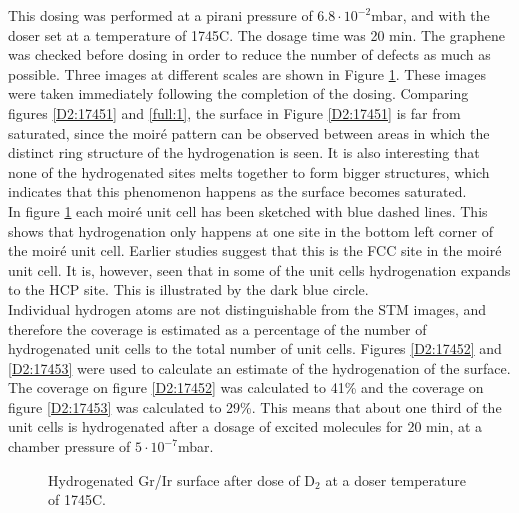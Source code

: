 This dosing was performed at a pirani pressure of $6.8 \cdot 10^{-2}$mbar, and with the doser set at a temperature of 1745\degree C. The dosage time was 20 min. The graphene was checked before dosing in order to reduce the number of defects as much as possible. Three images at different scales are shown in Figure \ref{D2:1745}. These images were taken immediately following the completion of the dosing. Comparing figures \ref{D2:17451} and \ref{full:1}, the surface in Figure \ref{D2:17451} is far from saturated, since the moiré pattern can be observed between areas in which the distinct ring structure of the hydrogenation is seen. It is also interesting that none of the hydrogenated sites melts together to form bigger structures, which indicates that this phenomenon happens as the surface becomes saturated.\\
In figure \ref{D2:1745} each moiré unit cell has been sketched with blue dashed lines. This shows that hydrogenation only happens at one site in the bottom left corner of the moiré unit cell. Earlier studies suggest that this is the FCC site in the moiré unit cell.\cite{Jakobunpublished} It is, however, seen that in some of the unit cells hydrogenation expands to the HCP site. This is illustrated by the dark blue circle.\\
Individual hydrogen atoms are not distinguishable from the STM images, and therefore the coverage is estimated as a percentage of the number of hydrogenated unit cells to the total number of unit cells. Figures \ref{D2:17452} and \ref{D2:17453} were used to calculate an estimate of the hydrogenation of the surface. The coverage on figure \ref{D2:17452} was calculated to 41\% and the coverage on figure \ref{D2:17453} was calculated to 29\%. This means that about one third of the unit cells is hydrogenated after a dosage of excited molecules for 20 min, at a chamber pressure of $5 \cdot 10^{-7}$mbar.

\begin{figure}[H]
\caption{Hydrogenated Gr/Ir surface after dose of D$_2$ at a doser temperature of 1745\degree C.}
\label{D2:1745}
\end{figure}

